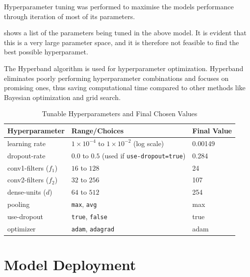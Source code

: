 Hyperparameter tuning was performed to maximise the models performance through iteration of most of its parameters. 

 shows a list of the parameters being tuned in the above model. It is evident that this is a very large parameter space, and it is therefore not feasible to find the best possible hyperparamet.

\begin{figure}[p]

\end{figure}


The Hyperband algorithm is used for hyperparameter optimization. Hyperband eliminates poorly performing hyperparameter combinations and focuses on promising ones, thus saving computational time compared to other methods like Bayesian optimization and grid search. 

\begin{table}[h]
\centering
\caption{Tunable Hyperparameters and Final Chosen Values}
\begin{tabular}{lll}
\toprule
\textbf{Hyperparameter} & \textbf{Range/Choices} & \textbf{Final Value} \\
\midrule
learning rate           & $1{\times}10^{-4}$ to $1{\times}10^{-2}$ (log scale) & 0.00149 \\
dropout-rate            & $0.0$ to $0.5$ (used if \texttt{use-dropout=true}) & 0.284 \\
conv1-filters ($f_1$)   & $16$ to $128$ & 24 \\
conv2-filters ($f_2$)   & $32$ to $256$ & 107 \\
dense-units ($d$)       & $64$ to $512$ & 254 \\
pooling                 & \texttt{max}, \texttt{avg} & max \\
use-dropout             & \texttt{true}, \texttt{false} & true \\
optimizer               & \texttt{adam}, \texttt{adagrad} & adam \\
\bottomrule
\end{tabular}
\label{tab:tunable_hyperparameters}
\end{table}


\section{Model Deployment} \label{sec:model_deployment}


